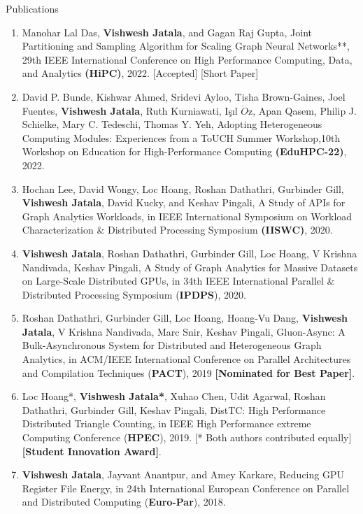\documentclass{resume} %
\begin{document}
\begin{rSection}{Publications}
\begin{enumerate}
\item  Manohar Lal Das, \textbf{Vishwesh Jatala}, and Gagan Raj Gupta, Joint Partitioning and Sampling Algorithm for Scaling Graph Neural Networks**, 29th IEEE International Conference on High Performance Computing, Data, and Analytics \textbf{(HiPC)}, 2022. [Accepted] [Short Paper]  

\item David P. Bunde, Kishwar Ahmed, Sridevi Ayloo, Tisha Brown-Gaines, Joel Fuentes, \textbf{Vishwesh Jatala}, Ruth Kurniawati, I\c{s}ıl $\ddot{O}$z, Apan Qasem, Philip J. Schielke, Mary C. Tedeschi, Thomas Y. Yeh, Adopting Heterogeneous Computing Modules: Experiences from a ToUCH Summer Workshop,10th Workshop on Education for High-Performance Computing \textbf{(EduHPC-22)}, 2022. \newline [Accepted]
\item Hochan Lee, David Wongy, Loc Hoang, Roshan Dathathri, Gurbinder Gill, \textbf{Vishwesh Jatala}, David Kucky, and Keshav Pingali, A Study of APIs for Graph Analytics Workloads, in IEEE International Symposium on Workload Characterization \& Distributed Processing Symposium \textbf{(IISWC)}, 2020.
\item \textbf{Vishwesh Jatala}, Roshan Dathathri, Gurbinder Gill, Loc Hoang, V Krishna Nandivada, Keshav Pingali, A Study of Graph Analytics for Massive Datasets on Large-Scale Distributed GPUs, in 34th IEEE International Parallel \& Distributed Processing Symposium (\textbf{IPDPS}), 2020. %
\item Roshan Dathathri, Gurbinder Gill, Loc Hoang, Hoang-Vu Dang, \textbf{Vishwesh Jatala}, V Krishna Nandivada, Marc Snir, Keshav Pingali, Gluon-Async: A Bulk-Asynchronous System for Distributed and Heterogeneous Graph Analytics, in ACM/IEEE International Conference on Parallel Architectures and Compilation Techniques (\textbf{PACT}), 2019 \textbf{[Nominated for Best Paper]}.
\item Loc Hoang*, \textbf{Vishwesh Jatala*}, Xuhao Chen, Udit Agarwal, Roshan Dathathri, Gurbinder Gill, Keshav Pingali, DistTC: High Performance Distributed Triangle Counting, in IEEE High Performance extreme Computing Conference (\textbf{HPEC}), 2019.  [* Both authors contributed equally] \textbf{[Student Innovation Award]}.
\item \textbf{Vishwesh Jatala}, Jayvant Anantpur, and Amey Karkare, Reducing GPU Register File Energy, in 24th International European Conference on Parallel and Distributed Computing (\textbf{Euro-Par}), 2018. 

\end{enumerate}
\end{rSection}
\end{document}
